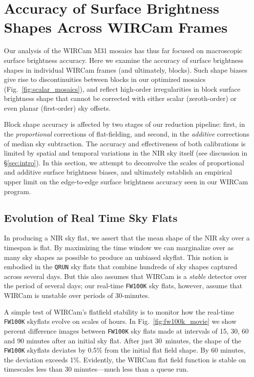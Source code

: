 \documentclass[iop]{emulateapj}
\newcommand{\Fig}[1]{Fig.~\ref{fig:#1}}  %
\newcommand{\Sec}[1]{\S\ref{sec:#1}}  %
\begin{document}
\section{Accuracy of Surface Brightness Shapes Across WIRCam Frames}
\label{sec:skyflatstability}

Our analysis of the WIRCam M31 mosaics has thus far focused on macroscopic surface brightness accuracy.
Here we examine the accuracy of surface brightness shapes in individual WIRCam frames (and ultimately, blocks).
Such shape biases give rise to discontinuities between blocks in our optimized mosaics (\Fig{scalar_mosaics}), and reflect high-order irregularities in block surface brightness shape that cannot be corrected with either scalar (zeroth-order) or even planar (first-order) sky offsets.

Block shape accuracy is affected by two stages of our reduction pipeline: first, in the \emph{proportional} corrections of flat-fielding, and second, in the \emph{additive} corrections of median sky subtraction.
The accuracy and effectiveness of both calibrations is limited by spatial and temporal variations in the NIR sky itself (see discussion in \Sec{intro}).
In this section, we attempt to deconvolve the scales of proportional and additive surface brightness biases, and ultimately establish an empirical upper limit on the edge-to-edge surface brightness accuracy seen in our WIRCam program.

\subsection{Evolution of Real Time Sky Flats} %
\label{sec:flatevo}

In producing a NIR sky flat, we assert that the mean shape of the NIR sky over a timespan is flat.
By maximizing the time window we can marginalize over as many sky shapes as possible to produce an unbiased skyflat.
This notion is embodied in the \texttt{QRUN} sky flats that combine hundreds of sky shapes captured across several days.
But this also assumes that WIRCam is a \emph{stable} detector over the period of several days; our real-time \texttt{FW100K} sky flats, however, assume that WIRCam is unstable over periods of 30-minutes.

A simple test of WIRCam's flatfield stability is to monitor how the real-time \texttt{FW100K} skyflats evolve on scales of hours.
In \Fig{fw100k_movie} we show percent difference images between \texttt{FW100K} sky flats made at intervals of 15, 30, 60 and 90 minutes after an initial sky flat.
After just 30~minutes, the shape of the \texttt{FW100K} skyflats deviates by 0.5\% from the initial flat field shape.
By 60 minutes, the deviation exceeds 1\%.
Evidently, the WIRCam flat field function is stable on timescales less than 30 minutes---much less than a queue run.
\end{document}
